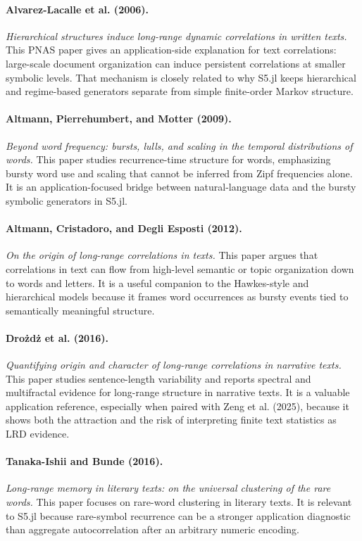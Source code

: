 \documentclass[11pt]{article}
\begin{document}
\paragraph{Alvarez-Lacalle et al. (2006).}
\emph{Hierarchical structures induce long-range dynamic correlations in written
texts.}
This PNAS paper gives an application-side explanation for text correlations:
large-scale document organization can induce persistent correlations at smaller
symbolic levels. That mechanism is closely related to why S5.jl keeps
hierarchical and regime-based generators separate from simple finite-order
Markov structure.

\paragraph{Altmann, Pierrehumbert, and Motter (2009).}
\emph{Beyond word frequency: bursts, lulls, and scaling in the temporal
distributions of words.}
This paper studies recurrence-time structure for words, emphasizing bursty word
use and scaling that cannot be inferred from Zipf frequencies alone. It is an
application-focused bridge between natural-language data and the bursty symbolic
generators in S5.jl.

\paragraph{Altmann, Cristadoro, and Degli Esposti (2012).}
\emph{On the origin of long-range correlations in texts.}
This paper argues that correlations in text can flow from high-level semantic or
topic organization down to words and letters. It is a useful companion to the
Hawkes-style and hierarchical models because it frames word occurrences as
bursty events tied to semantically meaningful structure.

\paragraph{Drożdż et al. (2016).}
\emph{Quantifying origin and character of long-range correlations in narrative
texts.}
This paper studies sentence-length variability and reports spectral and
multifractal evidence for long-range structure in narrative texts. It is a
valuable application reference, especially when paired with Zeng et al. (2025),
because it shows both the attraction and the risk of interpreting finite text
statistics as LRD evidence.

\paragraph{Tanaka-Ishii and Bunde (2016).}
\emph{Long-range memory in literary texts: on the universal clustering of the
rare words.}
This paper focuses on rare-word clustering in literary texts. It is relevant to
S5.jl because rare-symbol recurrence can be a stronger application diagnostic
than aggregate autocorrelation after an arbitrary numeric encoding.
\end{document}
